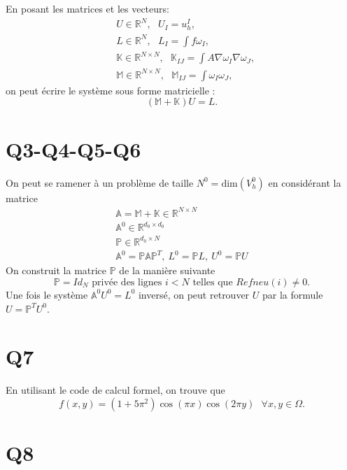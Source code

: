 \documentclass[11pt]{article}
\newcommand{\Am}{\mathbb{A}}
\renewcommand{\P}{\mathbb{P}}
\newcommand{\R}{\mathbb{R}}
\newcommand{\K}{\mathbb{K}}
\newcommand{\M}{\mathbb{M}}
\newcommand{\ms}{~~~}
\begin{document}
En posant les matrices et les vecteurs:
\begin{align}
  &U \in \R^{N}, \ms U_{I} = u_h^I, \\
  &L \in \R^{N}, \ms L_{I} = \int f \omega_I, \\
  &\K \in \R^{N\times N},\ms \K_{IJ} = \int A \nabla \omega_I \nabla \omega_J,  \\
  &\M \in \R^{N\times N},\ms \M_{IJ} = \int \omega_I \omega_J,
\end{align}
on peut écrire le système sous forme matricielle :
\begin{equation}
  (\M+\K) U = L.
\end{equation}


\section{Q3-Q4-Q5-Q6} 

On peut se ramener à un problème de taille $N^0 = \mbox{dim}(V^0_h)$ en considérant la matrice
\begin{gather}
  \Am = \M + \K \in \R^{N\times N } \\
  \Am^0 \in \R^{d_0\times d_0} \\
  \P \in \R^{d_0\times N} \\
  \Am^0 = \P\Am\P^T, ~ L^0 = \P L, ~ U^0 = \P U 
\end{gather} 
On construit la matrice $\P$ de la manière suivante
\begin{equation}
  \P = Id_N \mbox{~privée des lignes $i<N$ telles que $Refneu(i)\neq 0$.}
\end{equation}
Une fois le système $\Am^0 U^0 = L^0$ inversé, on peut retrouver $U$ par la formule $U=\P^T U^0$.

\section{Q7}

En utilisant le code de calcul formel, on trouve que
\begin{equation}
  f(x,y) = (1+5\pi^2)\cos(\pi x)\cos(2\pi y) \ms \forall x,y\in\Omega.
\end{equation}

\section{Q8}
\end{document}
